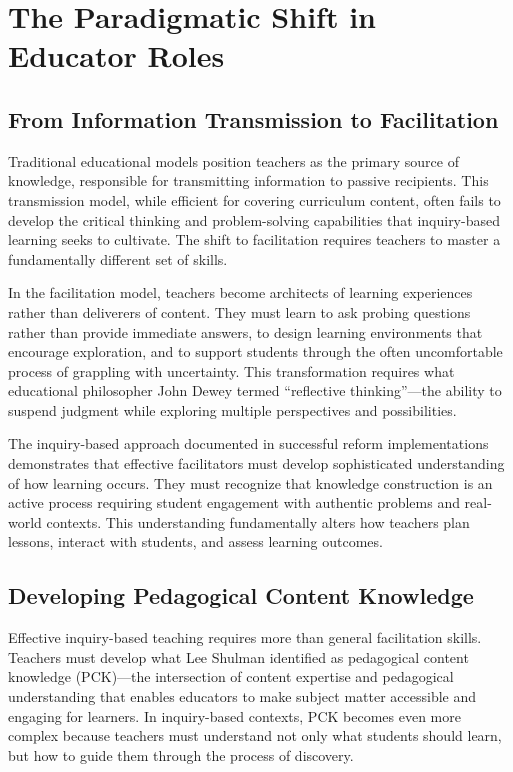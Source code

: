 \documentclass[
  Letterpaper,
]{scrbook}
\begin{document}
\section{The Paradigmatic Shift in Educator
Roles}\label{the-paradigmatic-shift-in-educator-roles}

\subsection{From Information Transmission to
Facilitation}\label{from-information-transmission-to-facilitation}

Traditional educational models position teachers as the primary source
of knowledge, responsible for transmitting information to passive
recipients. This transmission model, while efficient for covering
curriculum content, often fails to develop the critical thinking and
problem-solving capabilities that inquiry-based learning seeks to
cultivate. The shift to facilitation requires teachers to master a
fundamentally different set of skills.

In the facilitation model, teachers become architects of learning
experiences rather than deliverers of content. They must learn to ask
probing questions rather than provide immediate answers, to design
learning environments that encourage exploration, and to support
students through the often uncomfortable process of grappling with
uncertainty. This transformation requires what educational philosopher
John Dewey termed ``reflective thinking''---the ability to suspend
judgment while exploring multiple perspectives and possibilities.

The inquiry-based approach documented in successful reform
implementations demonstrates that effective facilitators must develop
sophisticated understanding of how learning occurs. They must recognize
that knowledge construction is an active process requiring student
engagement with authentic problems and real-world contexts. This
understanding fundamentally alters how teachers plan lessons, interact
with students, and assess learning outcomes.

\subsection{Developing Pedagogical Content
Knowledge}\label{developing-pedagogical-content-knowledge}

Effective inquiry-based teaching requires more than general facilitation
skills. Teachers must develop what Lee Shulman identified as pedagogical
content knowledge (PCK)---the intersection of content expertise and
pedagogical understanding that enables educators to make subject matter
accessible and engaging for learners. In inquiry-based contexts, PCK
becomes even more complex because teachers must understand not only what
students should learn, but how to guide them through the process of
discovery.
\end{document}
